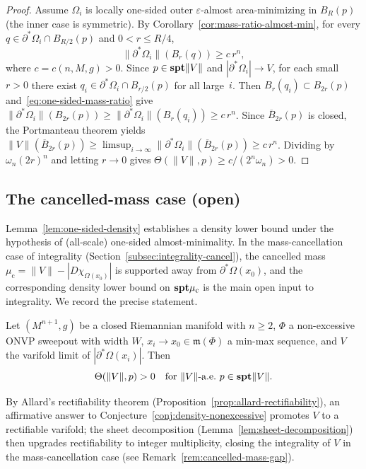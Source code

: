 \begin{proof}
Assume $\Omega_i$ is locally one-sided outer $\varepsilon$-almost area-minimizing in $B_R(p)$ (the inner case is symmetric).
By Corollary~\ref{cor:mass-ratio-almost-min}, for every $q \in \partial^*\Omega_i \cap B_{R/2}(p)$ and $0 < r \leq R/4$,
\begin{equation}\label{eq:one-sided-mass-ratio}
    \|\partial^*\Omega_i\|(B_r(q)) \geq c\,r^n,
\end{equation}
where $c = c(n, M, g) > 0$.
Since $p \in \mathbf{spt}\|V\|$ and $|\partial^*\Omega_i| \to V$, for each small $r > 0$ there exist $q_i \in \partial^*\Omega_i \cap B_{r/2}(p)$ for all large~$i$.
Then $B_r(q_i) \subset B_{2r}(p)$ and~\eqref{eq:one-sided-mass-ratio} give
$\|\partial^*\Omega_i\|(B_{2r}(p)) \geq \|\partial^*\Omega_i\|(B_r(q_i)) \geq c\,r^n$.
Since $\overline{B}_{2r}(p)$ is closed, the Portmanteau theorem yields
$\|V\|(\overline{B}_{2r}(p)) \geq \limsup_{i \to \infty} \|\partial^*\Omega_i\|(\overline{B}_{2r}(p)) \geq c\,r^n$.
Dividing by $\omega_n (2r)^n$ and letting $r \to 0$ gives $\Theta(\|V\|, p) \geq c/(2^n \omega_n) > 0$.
\end{proof}

\subsection{The cancelled-mass case (open)}\label{subsec:cancelled-mass-open}

Lemma~\ref{lem:one-sided-density} establishes a density lower bound under the hypothesis of (all-scale) one-sided almost-minimality. In the mass-cancellation case of integrality (Section~\ref{subsec:integrality-cancel}), the cancelled mass $\mu_{\mathrm{c}} = \|V\| - |D\chi_{\Omega(x_0)}|$ is supported away from $\partial^*\Omega(x_0)$, and the corresponding density lower bound on $\mathbf{spt}\mu_{\mathrm{c}}$ is the main open input to integrality. We record the precise statement.

\begin{conjecture}\label{conj:density-nonexcessive}
Let $(M^{n+1}, g)$ be a closed Riemannian manifold with $n \geq 2$, $\Phi$ a non-excessive ONVP sweepout with width $W$, $x_i \to x_0 \in \mathfrak{m}(\Phi)$ a min-max sequence, and $V$ the varifold limit of $|\partial^*\Omega(x_i)|$. Then
\[
    \Theta(\|V\|, p) > 0 \quad \text{for } \|V\|\text{-a.e.\ } p \in \mathbf{spt}\|V\|.
\]
\end{conjecture}

By Allard's rectifiability theorem (Proposition~\ref{prop:allard-rectifiability}), an affirmative answer to Conjecture~\ref{conj:density-nonexcessive} promotes $V$ to a rectifiable varifold; the sheet decomposition (Lemma~\ref{lem:sheet-decomposition}) then upgrades rectifiability to integer multiplicity, closing the integrality of $V$ in the mass-cancellation case (see Remark~\ref{rem:cancelled-mass-gap}).

